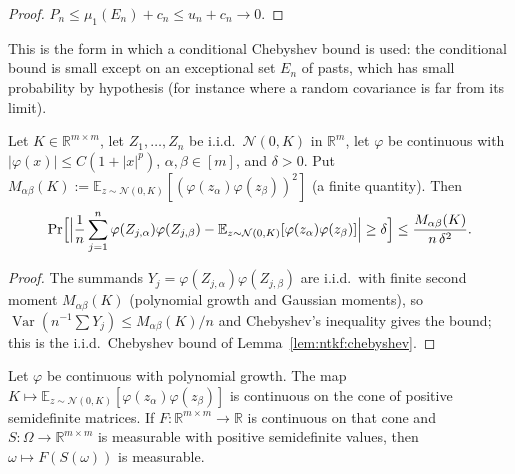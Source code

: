 \begin{proof}
  \leanok
$P_n\le\mu_1(E_n)+c_n\le u_n+c_n\to0$.
\end{proof}

This is the form in which a conditional Chebyshev bound is used: the conditional bound is small except on an exceptional set $E_n$ of pasts, which has small probability by hypothesis (for instance where a random covariance is far from its limit).

\begin{lemma}\label{lem:ntkcond:chebyshevFixedCov}
  \leanok
Let $K\in\mathbb R^{m\times m}$, let $Z_1,\dots,Z_n$ be i.i.d.\ $\mathcal N(0,K)$ in $\mathbb R^m$, let $\varphi$ be continuous with $|\varphi(x)|\le C(1+|x|^p)$, $\alpha,\beta\in[m]$, and $\delta>0$. Put $M_{\alpha\beta}(K):=\mathbb E_{z\sim\mathcal N(0,K)}[(\varphi(z_\alpha)\varphi(z_\beta))^2]$ (a finite quantity). Then
\[
  \Pr\Bigl[\Bigl|\frac1n\sum_{j=1}^n\varphi(Z_{j,\alpha})\varphi(Z_{j,\beta})-\mathbb E_{z\sim\mathcal N(0,K)}[\varphi(z_\alpha)\varphi(z_\beta)]\Bigr|\ge\delta\Bigr]\le\frac{M_{\alpha\beta}(K)}{n\,\delta^2}.
\]
\end{lemma}

\begin{proof}
  \leanok
The summands $Y_j=\varphi(Z_{j,\alpha})\varphi(Z_{j,\beta})$ are i.i.d.\ with finite second moment $M_{\alpha\beta}(K)$ (polynomial growth and Gaussian moments), so $\operatorname{Var}(n^{-1}\sum Y_j)\le M_{\alpha\beta}(K)/n$ and Chebyshev's inequality gives the bound; this is the i.i.d.\ Chebyshev bound of Lemma~\ref{lem:ntkf:chebyshev}.
\end{proof}

\begin{lemma}\label{lem:ntkcond:covarianceEntryContinuity}
  \leanok
Let $\varphi$ be continuous with polynomial growth. The map $K\mapsto\mathbb E_{z\sim\mathcal N(0,K)}[\varphi(z_\alpha)\varphi(z_\beta)]$ is continuous on the cone of positive semidefinite matrices. If $F:\mathbb R^{m\times m}\to\mathbb R$ is continuous on that cone and $S:\Omega\to\mathbb R^{m\times m}$ is measurable with positive semidefinite values, then $\omega\mapsto F(S(\omega))$ is measurable.
\end{lemma}


